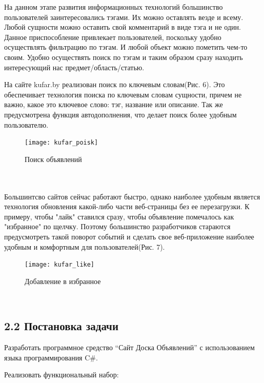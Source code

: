 \documentclass[14pt,a4paper]{extreport}
\begin{document}
          На данном этапе развития информационных технологий большинство пользователей заинтересовались тэгами. Их можно оставлять везде и всему. Любой сущности можно оставить свой комментарий в виде тэга и не один. Данное приспособление привлекает пользователей, поскольку удобно осуществлять фильтрацию по тэгам. И любой объект можно пометить чем-то своим. Удобно осуществять поиск по тэгам и таким образом сразу находить интересующий нас предмет/область/статью.\par
	 На сайте kufar.by реализован поиск по ключевым словам(Рис. 6). Это обеспечивает технология поиска по ключевым словам сущности, причем не важно, какое это ключевое слово: тэг, название или описание. Так же предусмотрена функция автодополнения, что делает поиск более удобным пользователю.\par
	\begin{figure}[h]
	\begin{center}
	\texttt{[image: kufar\_poisk]}
	\caption{Поиск объявлений}
	\end{center}
	\end{figure}
	~\\
	~\\
         Большинтсво сайтов сейчас работают быстро, однако наиболее удобным является технология обновления какой-либо части веб-страницы без ее перезагрузки. К примеру, чтобы "лайк" ставился сразу, чтобы объявление помечалось как "избранное" по щелчку. Поэтому большинство разработчиков стараются предусмотреть такой поворот событий и сделать свое веб-приложение наиболее удобным и комфортным для пользователей(Рис. 7).
	\begin{figure}[h]
	\begin{center}
	\texttt{[image: kufar\_like]}
	\caption{Добавление в избранное}
	\end{center}
	\end{figure}
	~\\
	\subsection*{\normalsize\hspace{4ex}2.2 Постановка задачи}
	\hspace{2ex}Разработать программное средство “Сайт Доска Объявлений” с использованием языка программирования C\#. 


	\hspace{2ex}Реализовать функциональный набор:
\end{document}
